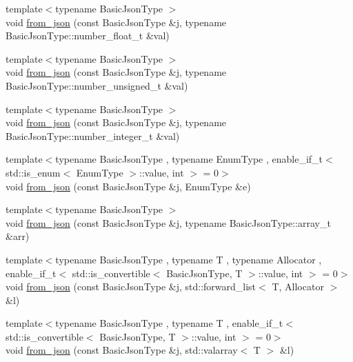 \begin{DoxyCompactItemize}
\item 
{\footnotesize template$<$typename Basic\+Json\+Type $>$ }\\void \hyperlink{namespacenlohmann_1_1detail_a7cb5dd7d46a60e65f9a8e0873b3f7dd8}{from\+\_\+json} (const Basic\+Json\+Type \&j, typename Basic\+Json\+Type\+::number\+\_\+float\+\_\+t \&val)
\item 
{\footnotesize template$<$typename Basic\+Json\+Type $>$ }\\void \hyperlink{namespacenlohmann_1_1detail_ace4d5680ba413d9fd897ccb5d9c61a1c}{from\+\_\+json} (const Basic\+Json\+Type \&j, typename Basic\+Json\+Type\+::number\+\_\+unsigned\+\_\+t \&val)
\item 
{\footnotesize template$<$typename Basic\+Json\+Type $>$ }\\void \hyperlink{namespacenlohmann_1_1detail_a047d881e611fcac709dc318f730a1732}{from\+\_\+json} (const Basic\+Json\+Type \&j, typename Basic\+Json\+Type\+::number\+\_\+integer\+\_\+t \&val)
\item 
{\footnotesize template$<$typename Basic\+Json\+Type , typename Enum\+Type , enable\+\_\+if\+\_\+t$<$ std\+::is\+\_\+enum$<$ Enum\+Type $>$\+::value, int $>$  = 0$>$ }\\void \hyperlink{namespacenlohmann_1_1detail_a5440d650150d01e8015133521351b459}{from\+\_\+json} (const Basic\+Json\+Type \&j, Enum\+Type \&e)
\item 
{\footnotesize template$<$typename Basic\+Json\+Type $>$ }\\void \hyperlink{namespacenlohmann_1_1detail_abc62958462b916726b89f25fa381a129}{from\+\_\+json} (const Basic\+Json\+Type \&j, typename Basic\+Json\+Type\+::array\+\_\+t \&arr)
\item 
{\footnotesize template$<$typename Basic\+Json\+Type , typename T , typename Allocator , enable\+\_\+if\+\_\+t$<$ std\+::is\+\_\+convertible$<$ Basic\+Json\+Type, T $>$\+::value, int $>$  = 0$>$ }\\void \hyperlink{namespacenlohmann_1_1detail_a5cfb765aad92795abd7fda29d017272a}{from\+\_\+json} (const Basic\+Json\+Type \&j, std\+::forward\+\_\+list$<$ T, Allocator $>$ \&l)
\item 
{\footnotesize template$<$typename Basic\+Json\+Type , typename T , enable\+\_\+if\+\_\+t$<$ std\+::is\+\_\+convertible$<$ Basic\+Json\+Type, T $>$\+::value, int $>$  = 0$>$ }\\void \hyperlink{namespacenlohmann_1_1detail_a3df497b1d3977f071b488ecac1401517}{from\+\_\+json} (const Basic\+Json\+Type \&j, std\+::valarray$<$ T $>$ \&l)

\end{DoxyCompactItemize}
